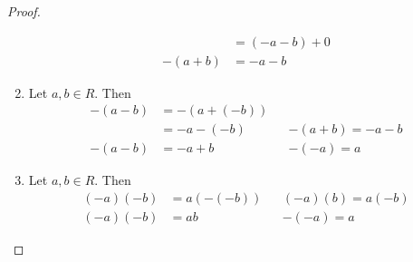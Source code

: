 \documentclass [12pt] {article}
\begin{document}
\begin{proof}
\begin{enumerate}[label=(\arabic*)]
\begin{align*}
                         &= (-a - b) + 0 \\
                -(a + b) &= -a - b
            \end{align*}
        \item Let $a, b \in R$. Then
            \begin{align*}
                -(a - b) &= -(a + (-b)) \\
                         &= -a - (-b) && -(a + b) = -a - b \\
                -(a - b) &= -a + b && -(-a) = a
            \end{align*}
        \item Let $a, b \in R$. Then
            \begin{align*}
                (-a)(-b) &= a(-(-b)) && (-a)(b) = a(-b) \\
                (-a)(-b) &= ab && -(-a) = a
            \end{align*}
    \end{enumerate}
\end{proof}
\end{document}
